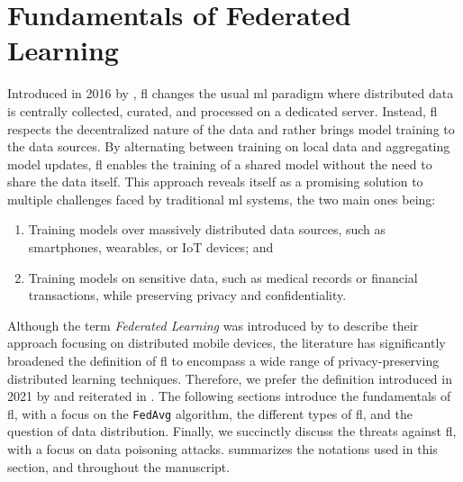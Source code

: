 \section{Fundamentals of Federated Learning\label{sec:bg.fl}}

Introduced in 2016 by \textcite{mcmahan_Communicationefficientlearningdeep_2017}, \acrfull{fl} changes the usual \gls{ml} paradigm where distributed data is centrally collected, curated, and processed on a dedicated server. 
Instead, \gls{fl} respects the decentralized nature of the data and rather brings model training to the data sources.
By alternating between training on local data and aggregating model updates, \gls{fl} enables the training of a shared model without the need to share the data itself.
This approach reveals itself as a promising solution to multiple challenges faced by traditional \gls{ml} systems, the two main ones being:
\begin{enumerate}
    \item Training models over massively distributed data sources, such as smartphones, wearables, or IoT devices; and
    \item Training models on sensitive data, such as medical records or financial transactions, while preserving privacy and confidentiality.
\end{enumerate}

Although the term \emph{Federated Learning} was introduced by \textcite{mcmahan_Communicationefficientlearningdeep_2017} to describe their approach focusing on distributed mobile devices, the literature has significantly broadened the definition of \gls{fl} to encompass a wide range of privacy-preserving distributed learning techniques.
Therefore, we prefer the definition introduced in 2021 by \textcite{kairouz_AdvancesOpenProblems_2021} and reiterated in .
The following sections introduce the fundamentals of \gls{fl}, with a focus on the \texttt{FedAvg} algorithm, the different types of \gls{fl}, and the question of data distribution.
Finally, we succinctly discuss the threats against \gls{fl}, with a focus on data poisoning attacks.
 summarizes the notations used in this section, and throughout the manuscript.

